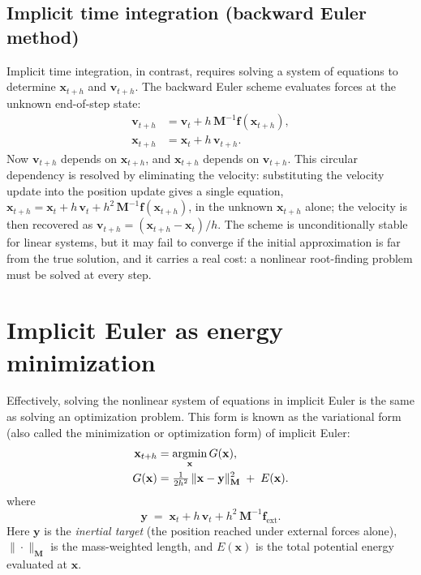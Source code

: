 \subsection{Implicit time integration (backward Euler method)}
\label{ssec:ImplicitEuler}
Implicit time integration, in contrast, requires solving a system of equations to
determine $\mathbf{x}_{t+h}$ and $\mathbf{v}_{t+h}$. The backward Euler scheme
evaluates forces at the unknown end-of-step state:
\begin{align}
    \mathbf{v}_{t+h} &= \mathbf{v}_t + h\,\mathbf{M}^{-1}\mathbf{f}(\mathbf{x}_{t+h}), \\
    \mathbf{x}_{t+h} &= \mathbf{x}_t + h\,\mathbf{v}_{t+h}.
\end{align}
Now $\mathbf{v}_{t+h}$ depends on $\mathbf{x}_{t+h}$, and $\mathbf{x}_{t+h}$
depends on $\mathbf{v}_{t+h}$. This circular dependency is resolved by
eliminating the velocity: substituting the velocity update into the
position update gives a single equation,
$\mathbf{x}_{t+h} = \mathbf{x}_t + h\,\mathbf{v}_t + h^{2}\,\mathbf{M}^{-1}\mathbf{f}(\mathbf{x}_{t+h})$,
in the unknown $\mathbf{x}_{t+h}$ alone; the velocity is then recovered as
$\mathbf{v}_{t+h} = (\mathbf{x}_{t+h} - \mathbf{x}_t)/h$. The scheme is
unconditionally stable for linear systems, but it may
fail to converge if the initial approximation is far from the true solution, and
it carries a real cost: a nonlinear root-finding problem must be solved at every
step.

\section{Implicit Euler as energy minimization}
\label{sec:Variational}
Effectively, solving the nonlinear system of equations in implicit Euler is the same as
solving an optimization problem. This form is known as the variational form
(also called the minimization or optimization form) of implicit Euler:
\begin{equation}
    \label{eq:G}
    \begin{aligned}
        \mathbf{x}_{t+h} &= \operatorname*{argmin}\limits_{\mathbf{x}} G(\mathbf{x}),\\
        G(\mathbf{x}) &= \tfrac{1}{2 h^{2}} \,\|\mathbf{x} - \mathbf{y}\|_{\mathbf{M}}^{2}
                         \;+\; E(\mathbf{x}).
    \end{aligned}
\end{equation}
where
\begin{equation*}
    \mathbf{y} \;=\; \mathbf{x}_{t} + h\,\mathbf{v}_{t} + h^{2}\,\mathbf{M}^{-1}\mathbf{f}_{\mathrm{ext}}.
\end{equation*}
Here $\mathbf{y}$ is the \emph{inertial target} (the position reached under
external forces alone), $\|\cdot\|_{\mathbf{M}}$ is the mass-weighted length, and
$E(\mathbf{x})$ is the total potential energy evaluated at $\mathbf{x}$.


